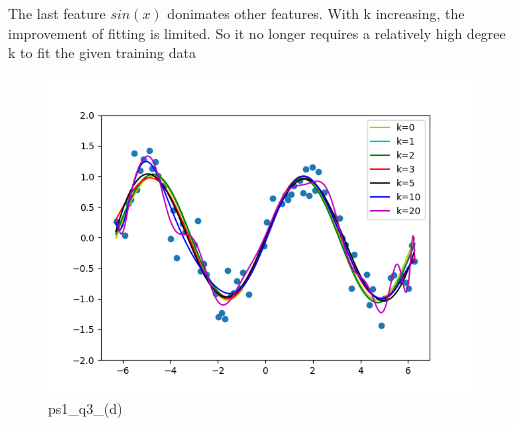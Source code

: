\begin{answer}

The last feature $sin(x)$ donimates other features. With k increasing, the improvement of fitting is limited. So it no longer requires a relatively high degree k to fit the given training data

\begin{figure}
    \centering
    \includegraphics[width=0.5\linewidth]{ps1_q3_(d).png}
    \caption{ps1\_q3\_(d)}
    \label{fig:enter-label}
\end{figure}
\end{answer}
